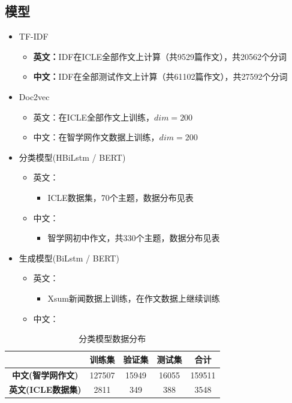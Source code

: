 \documentclass[11pt]{article}
\begin{document}
\begin{CJK}{UTF8}{gkai}
\subsection{模型}
\begin{itemize}
  \item TF-IDF
  \begin{itemize}
    \item \textbf{英文：}IDF在ICLE全部作文上计算（共9529篇作文），共20562个分词
    \item \textbf{中文：}IDF在全部测试作文上计算（共61102篇作文），共27592个分词
  \end{itemize}
  \item Doc2vec
  \begin{itemize}
    \item 英文：在ICLE全部作文上训练，$dim=200$
    \item 中文：在智学网作文数据上训练，$dim=200$
  \end{itemize}
  \item 分类模型(HBiLstm / BERT)
  \begin{itemize}
    \item 英文：
    \begin{itemize}
      \item ICLE数据集，70个主题，数据分布见表
    \end{itemize}
    \item 中文：
    \begin{itemize}
      \item 智学网初中作文，共330个主题，数据分布见表
    \end{itemize} 
  \end{itemize}
  \item 生成模型(BiLstm / BERT)
  \begin{itemize}
    \item 英文：
    \begin{itemize}
      \item Xsum新闻数据上训练，在作文数据上继续训练
    \end{itemize}
    \item 中文：
  \end{itemize}
\end{itemize}

\begin{table}[htbp]
  \centering
  \begin{tabular}{c|cccc}
    \hline
    & \textbf{训练集} & \textbf{验证集} & \textbf{测试集} & \textbf{合计} \\
    \hline
    \textbf{中文(智学网作文)} & 127507 & 15949 & 16055 & 159511 \\
    \hline
    \textbf{英文(ICLE数据集)} & 2811  & 349   & 388   & 3548 \\
    \hline
  \end{tabular}%
  \caption{分类模型数据分布}
  \label{tab:addlabel}%
\end{table}%


\end{CJK}
\end{document}
